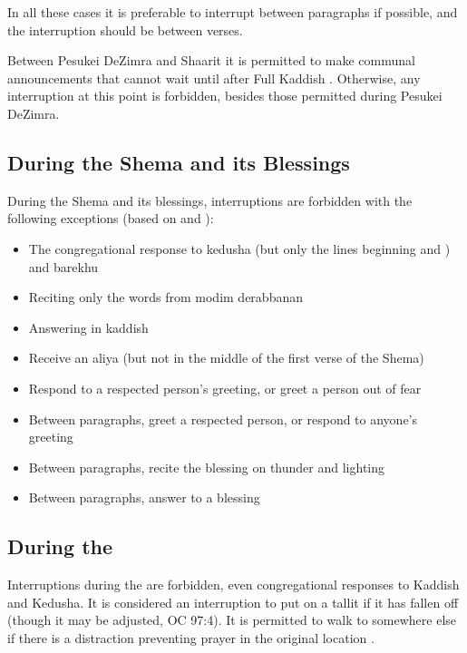 In all these cases it is preferable to interrupt between paragraphs if possible, and the interruption should be between verses.

Between Pesukei DeZimra and Sha\heth arit it is permitted to make communal announcements that cannot wait until after Full Kaddish \parencite*[16:2]{PH}.  Otherwise, any interruption at this point is forbidden, besides those permitted during Pesukei DeZimra.

\subsection{During the Shema and its Blessings}

During the Shema and its blessings, interruptions are forbidden with the following exceptions (based on \cite*[``Table of Permitted Responses"]{Koren} and \cite*[16:5]{PH}):
\begin{itemize}
	\item The congregational response to kedusha (but only the lines beginning  and ) and barekhu
	\item Reciting only the words  from modim derabbanan
	\item Answering  in kaddish
	\item Receive an aliya (but not in the middle of the first verse of the Shema)
	\item Respond to a respected person's greeting, or greet a person out of fear
	\item Between paragraphs, greet a respected person, or respond to anyone's greeting
	\item Between paragraphs, recite the blessing on thunder and lighting
	\item Between paragraphs, answer  to a blessing
\end{itemize}

\subsection{During the \amidah}

Interruptions during the \amidah are forbidden, even congregational responses to Kaddish and Kedusha. It is considered an interruption to put on a tallit if it has fallen off (though it may be adjusted, OC 97:4).  It is permitted to walk to somewhere else if there is a distraction preventing prayer in the original location \parencite*[17:15]{PH}.

